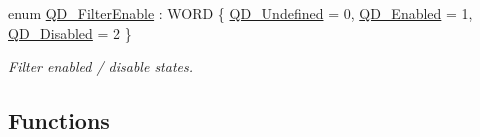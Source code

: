 \begin{DoxyCompactItemize}
\item 
enum \hyperlink{group___t_cube_quad_gaf9cb69779549db4792c4e647b69eb29f}{Q\+D\+\_\+\+Filter\+Enable} \+: W\+O\+RD \{ \hyperlink{group___t_cube_quad_ggaf9cb69779549db4792c4e647b69eb29fab52470ce33fdc12e7130e7112b6c6501}{Q\+D\+\_\+\+Undefined} = 0, 
\hyperlink{group___t_cube_quad_ggaf9cb69779549db4792c4e647b69eb29fa245d84225135fc5307d5b250f5df0513}{Q\+D\+\_\+\+Enabled} = 1, 
\hyperlink{group___t_cube_quad_ggaf9cb69779549db4792c4e647b69eb29fa7381e7ed6a845cd5edba67dcc818513c}{Q\+D\+\_\+\+Disabled} = 2
 \}\begin{DoxyCompactList}\small\item\em Filter enabled / disable states. \end{DoxyCompactList}
\end{DoxyCompactItemize}
\subsection*{Functions}
